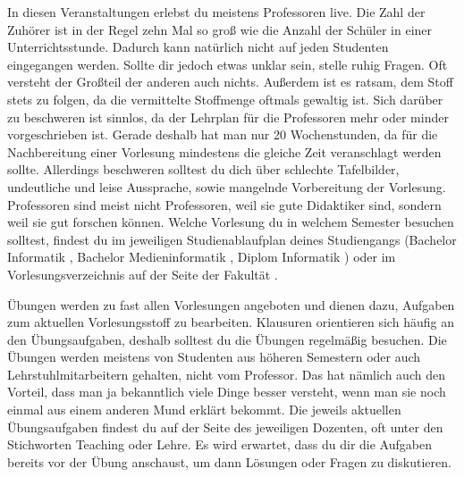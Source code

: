 
In diesen Veranstaltungen erlebst du meistens Professoren live.
Die Zahl der Zuhörer ist in der Regel zehn Mal so groß wie die Anzahl der Schüler in einer Unterrichtsstunde. Dadurch kann natürlich nicht auf jeden Studenten eingegangen werden.
Sollte dir jedoch etwas unklar sein, stelle ruhig Fragen. Oft versteht der Großteil der anderen auch nichts.
Außerdem ist es ratsam, dem Stoff stets zu folgen, da die vermittelte Stoffmenge oftmals gewaltig ist. Sich darüber zu beschweren ist sinnlos, da der Lehrplan für die Professoren mehr oder minder vorgeschrieben ist.
Gerade deshalb hat man nur 20 Wochenstunden, da für die Nachbereitung einer Vorlesung mindestens die gleiche Zeit veranschlagt werden sollte.
Allerdings beschweren solltest du dich über schlechte Tafelbilder, undeutliche und leise Aussprache, sowie mangelnde Vorbereitung der Vorlesung.
Professoren sind meist nicht Professoren, weil sie gute Didaktiker sind, sondern weil sie gut forschen können.
Welche Vorlesung du in welchem Semester besuchen solltest, findest du im jeweiligen Studienablaufplan deines Studiengangs
(Bachelor Informatik , Bachelor Medieninformatik , Diplom Informatik ) oder im Vorlesungsverzeichnis auf der Seite der Fakultät .



Übungen werden zu fast allen Vorlesungen angeboten und dienen dazu, Aufgaben zum aktuellen Vorlesungsstoff zu bearbeiten. Klausuren orientieren sich häufig an den Übungsaufgaben, deshalb solltest du die Übungen
regelmäßig besuchen. Die Übungen werden meistens von Studenten aus höheren Semestern oder auch Lehrstuhlmitarbeitern gehalten, nicht vom Professor.
Das hat nämlich auch den Vorteil, dass man ja bekanntlich viele Dinge besser versteht, wenn man sie noch einmal aus einem anderen Mund erklärt bekommt.
Die jeweils aktuellen Übungsaufgaben findest du auf der Seite des jeweiligen Dozenten, oft unter den Stichworten Teaching oder Lehre.
Es wird erwartet, dass du dir die Aufgaben bereits vor der Übung anschaust, um dann Lösungen oder Fragen zu diskutieren.



